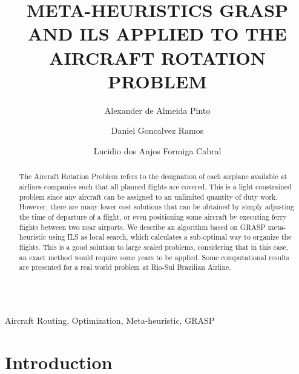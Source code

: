 \documentclass{endm}
\begin{document}
\begin{verbatim}\end{verbatim}\vspace{2.5cm}

\begin{frontmatter}

\title{META-HEURISTICS GRASP AND ILS APPLIED TO THE AIRCRAFT ROTATION PROBLEM}

\author{Alexander de Almeida Pinto}
\address{LAVID\\ Federal University of Paraiba \\ Joao Pessoa, Brazil}

\author{Daniel Goncalvez Ramos}
\address{LAVID\\ Federal University of Paraiba \\ Joao Pessoa, Brazil}

\author{Lucidio dos Anjos Formiga Cabral}
\address{IT Department\\ Federal University of Paraiba \\ Joao Pessoa, Brazil}

\begin{abstract}
The Aircraft Rotation Problem refers to the designation of each airplane available at airlines companies such that all planned flights are covered. This is a light constrained problem since any aircraft can be assigned to an unlimited quantity of duty work. However, there are many lower cost solutions that can be obtained by simply adjusting the time of departure of a flight, or even positioning some aircraft by executing ferry flights between two near airports. We describe an algorithm based on GRASP meta-heuristic using ILS as local search, which calculates a sub-optimal way to organize the flights. This is a good solution to large scaled problems, considering that in this case, an exact method would require some years to be applied. Some computational results are presented for a real world problem at Rio-Sul Brazilian Airline.
\end{abstract}

\begin{keyword}
Aircraft Routing, Optimization, Meta-heuristic, GRASP
\end{keyword}

\end{frontmatter}


\section{Introduction}\label{intro}
\end{document}
